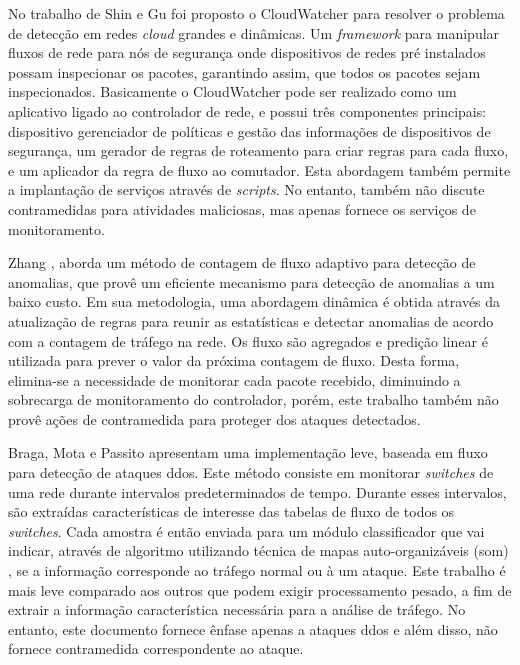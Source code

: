 No trabalho de Shin e Gu \cite{Shin:2012}  foi proposto o CloudWatcher para resolver o problema de detecção em redes \textit{cloud} grandes e dinâmicas. Um \textit{framework} para manipular fluxos de rede para nós de segurança onde dispositivos de redes pré instalados possam inspecionar os pacotes, garantindo assim, que todos os pacotes sejam inspecionados. Basicamente o CloudWatcher pode ser realizado como um aplicativo ligado ao controlador de rede, e possui três componentes principais: dispositivo gerenciador de políticas e gestão das informações de dispositivos de segurança, um gerador de regras de roteamento para criar regras para cada fluxo, e um aplicador da regra de fluxo ao comutador. Esta abordagem também permite a implantação de serviços através de \textit{scripts}. No entanto, também não discute contramedidas para atividades maliciosas, mas apenas fornece os serviços de monitoramento.


Zhang \cite{Zhang:2013}, aborda um método de contagem de fluxo adaptivo para detecção de anomalias, que  provê um eficiente mecanismo para detecção de anomalias a um baixo custo. Em sua metodologia, uma abordagem dinâmica é obtida através da atualização de regras para reunir as estatísticas e detectar anomalias de acordo com a contagem de tráfego na rede. Os fluxo são agregados e predição linear é utilizada para prever o valor da próxima contagem de fluxo. Desta forma, elimina-se a necessidade de monitorar cada pacote recebido, diminuindo a sobrecarga de monitoramento do controlador, porém, este trabalho também não provê ações de contramedida para proteger dos ataques detectados.


Braga, Mota e Passito \cite{Braga:2010} apresentam uma implementação leve, baseada em fluxo para detecção de ataques \gls{ddos}. Este método consiste em monitorar \textit{switches} de uma rede durante intervalos predeterminados de tempo. Durante esses intervalos, são extraídas características de interesse das tabelas de fluxo de todos os \textit{switches}. Cada amostra é então enviada para um módulo classificador que vai indicar, através de algoritmo utilizando técnica de mapas auto-organizáveis (\gls{som}) \cite{Kohonen:1990}, se a informação corresponde ao tráfego normal ou à um ataque. Este trabalho é mais leve comparado aos outros que podem exigir processamento pesado, a fim de extrair a informação característica necessária para a análise de tráfego. No entanto, este documento fornece ênfase apenas a ataques \gls{ddos} e além disso, não fornece contramedida correspondente ao ataque.


